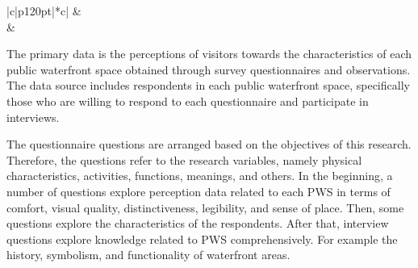 \documentclass[draft, ../riset_senja.tex]{subfiles}
\begin{document}
\begin{landscape}
	\setlength\tabcolsep{1pt}
	\begin{table}
		\centering
		\caption{Research Timeline Plan}
		\label{tab:linimasa}
		\begin{tabular}{|c|p{120pt}|*{\NumMonths}{c|}} \hline
			 &  \YearHeadRow \\
			                    & \MonthHeadRow                       \\ \hline
			\NewGroup
			\NewGroup
			\NewGroup
			\NewGroup
			\NewGroup
			\NewGroup
			\NewGroup
			\NewGroup
		\end{tabular}
	\end{table}
\end{landscape}

The primary data is the perceptions of visitors towards the characteristics of each public waterfront space obtained through survey questionnaires and observations.
The data source includes respondents in each public waterfront space, specifically those who are willing to respond to each questionnaire and participate in interviews.

The questionnaire questions are arranged based on the objectives of this research. Therefore, the questions refer to the research variables, namely physical characteristics, activities, functions, meanings, and others.
In the beginning, a number of questions explore perception data related to each PWS in terms of comfort, visual quality, distinctiveness, legibility, and sense of place.
Then, some questions explore the characteristics of the respondents. After that, interview questions explore knowledge related to PWS comprehensively.
For example the history, symbolism, and functionality of waterfront areas.
\end{document}
